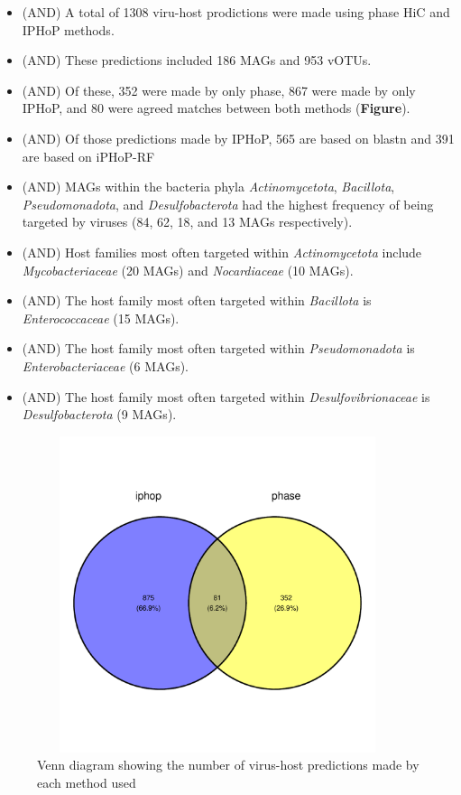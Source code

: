 \documentclass[
]{article}
\providecommand{\tightlist}{%
  \setlength{\itemsep}{0pt}\setlength{\parskip}{0pt}}
\begin{document}
\begin{itemize}
\tightlist
\item
  (AND) A total of 1308 viru-host prodictions were made using phase HiC
  and IPHoP methods.
\item
  (AND) These predictions included 186 MAGs and 953 vOTUs.
\item
  (AND) Of these, 352 were made by only phase, 867 were made by only
  IPHoP, and 80 were agreed matches between both methods
  (\textbf{Figure}).
\item
  (AND) Of those predictions made by IPHoP, 565 are based on blastn and
  391 are based on iPHoP-RF
\item
  (AND) MAGs within the bacteria phyla \emph{Actinomycetota},
  \emph{Bacillota}, \emph{Pseudomonadota}, and \emph{Desulfobacterota}
  had the highest frequency of being targeted by viruses (84, 62, 18,
  and 13 MAGs respectively).
\item
  (AND) Host families most often targeted within \emph{Actinomycetota}
  include \emph{Mycobacteriaceae} (20 MAGs) and \emph{Nocardiaceae} (10
  MAGs).
\item
  (AND) The host family most often targeted within \emph{Bacillota} is
  \emph{Enterococcaceae} (15 MAGs).
\item
  (AND) The host family most often targeted within \emph{Pseudomonadota}
  is \emph{Enterobacteriaceae} (6 MAGs).
\item
  (AND) The host family most often targeted within
  \emph{Desulfovibrionaceae} is \emph{Desulfobacterota} (9 MAGs).
\end{itemize}

\begin{figure}
\includegraphics[width=400px,height=350px]{../../data/results/figures/updated_venndiagram_phase_iphop} \caption{Venn diagram showing the number of virus-host predictions made by each method used}\label{fig:FigZ}
\end{figure}
\end{document}
